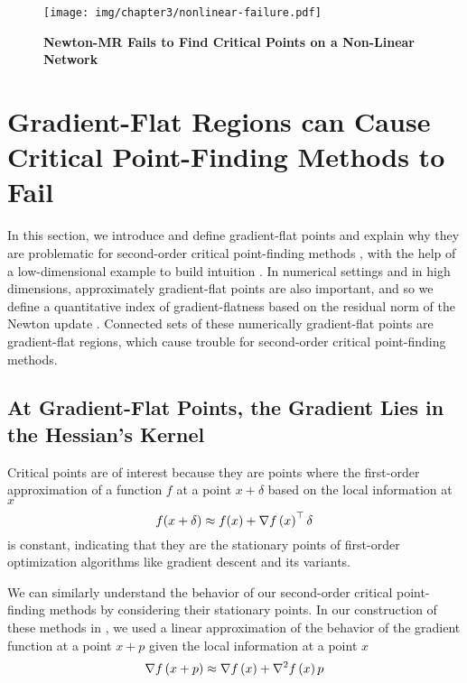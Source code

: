 \documentclass[../../thesis.tex]{subfiles}
\begin{document}
\begin{figure}[h]
	\begin{center}
		\texttt{[image: img/chapter3/nonlinear-failure.pdf]}
	\end{center}
	\caption{\textbf{Newton-MR Fails to Find Critical Points
	on a Non-Linear Network}}
\end{figure}

\section{Gradient-Flat Regions can Cause Critical Point-Finding Methods to Fail}%

In this section,
we introduce and define gradient-flat points and
explain why they are problematic for second-order
critical point-finding methods
,
with the help of a low-dimensional example
to build intuition
.
In numerical settings and in high dimensions,
approximately gradient-flat points are also important,
and so we define a quantitative index of gradient-flatness
based on the residual norm of the Newton update
.
Connected sets of these numerically gradient-flat points
are gradient-flat regions,
which cause trouble for
second-order critical point-finding methods.

\subsection{At Gradient-Flat Points, the Gradient Lies in the Hessian's Kernel}%

Critical points are of interest because
they are points where the first-order approximation
of a function  $f$ at a point
$x+\delta$ based on the local information at $x$
\begin{equation}
    f(x + \delta) \approx f(x) + \nabla f\left(x\right)^\top \delta
\end{equation}
is constant, indicating that they are the stationary points
of first-order optimization algorithms
like gradient descent and its variants.

We can similarly understand the behavior of our second-order
critical point-finding methods by considering their stationary points.
In our construction of these methods in
,
we used a linear approximation of the behavior
of the gradient function
at a point $x + p$ given the local information at a point $x$
\begin{equation}
    \nabla f\left(x + p\right) \approx \nabla f\left(x\right) + \nabla^2f\left(x\right)p
\end{equation}
\end{document}
